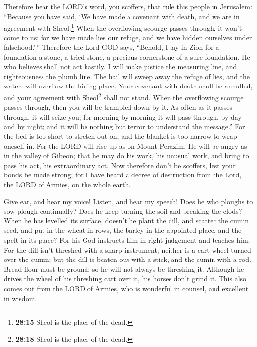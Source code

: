  Therefore hear the LORD's word, you scoffers, that rule
this people in Jerusalem:  ``Because you have said, `We
have made a covenant with death, and we are in agreement with
Sheol.\footnote{\textbf{28:15} Sheol is the place of the dead.} When the
overflowing scourge passes through, it won't come to us; for we have
made lies our refuge, and we have hidden ourselves under falsehood.'\,''
 Therefore the Lord GOD says, ``Behold, I lay in Zion for
a foundation a stone, a tried stone, a precious cornerstone of a sure
foundation. He who believes shall not act hastily.  I
will make justice the measuring line, and righteousness the plumb line.
The hail will sweep away the refuge of lies, and the waters will
overflow the hiding place.  Your covenant with death
shall be annulled, and your agreement with Sheol\footnote{\textbf{28:18}
  Sheol is the place of the dead.} shall not stand. When the overflowing
scourge passes through, then you will be trampled down by it.
 As often as it passes through, it will seize you; for
morning by morning it will pass through, by day and by night; and it
will be nothing but terror to understand the message.'' 
For the bed is too short to stretch out on, and the blanket is too
narrow to wrap oneself in.  For the LORD will rise up as
on Mount Perazim. He will be angry as in the valley of Gibeon; that he
may do his work, his unusual work, and bring to pass his act, his
extraordinary act.  Now therefore don't be scoffers, lest
your bonds be made strong; for I have heard a decree of destruction from
the Lord, the LORD of Armies, on the whole earth.

 Give ear, and hear my voice! Listen, and hear my speech!
 Does he who ploughs to sow plough continually? Does he
keep turning the soil and breaking the clods?  When he
has levelled its surface, doesn't he plant the dill, and scatter the
cumin seed, and put in the wheat in rows, the barley in the appointed
place, and the spelt in its place?  For his God instructs
him in right judgement and teaches him.  For the dill
isn't threshed with a sharp instrument, neither is a cart wheel turned
over the cumin; but the dill is beaten out with a stick, and the cumin
with a rod.  Bread flour must be ground; so he will not
always be threshing it. Although he drives the wheel of his threshing
cart over it, his horses don't grind it.  This also comes
out from the LORD of Armies, who is wonderful in counsel, and excellent
in wisdom.

